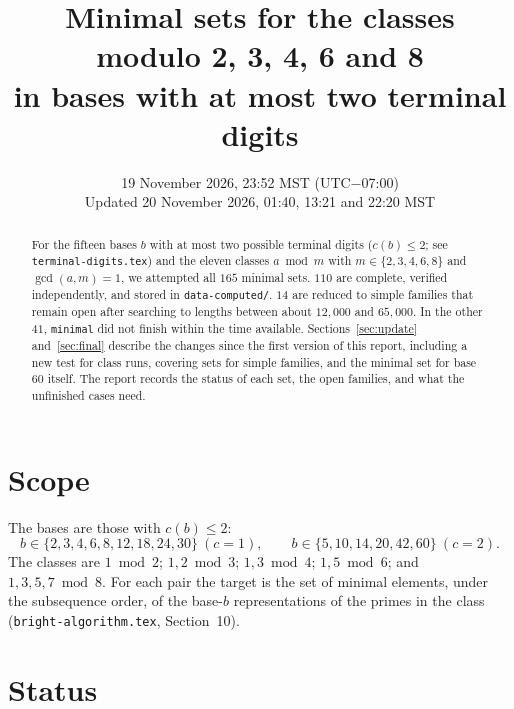 \documentclass[11pt]{article}
\title{Minimal sets for the classes modulo 2, 3, 4, 6 and 8\\ in bases with at most two terminal digits}
\author{}  %
\date{19 November 2026, 23:52 MST (UTC$-$07:00)\\ Updated 20 November 2026, 01:40, 13:21 and 22:20 MST}
\newcommand{\code}[1]{\texttt{#1}}
\begin{document}
\maketitle

\begin{abstract}
For the fifteen bases $b$ with at most two possible terminal digits ($c(b)\le 2$; see \code{terminal-digits.tex}) and the eleven classes $a \bmod m$ with $m\in\{2,3,4,6,8\}$ and $\gcd(a,m)=1$, we attempted all $165$ minimal sets. $110$ are complete, verified independently, and stored in \code{data-computed/}. $14$ are reduced to simple families that remain open after searching to lengths between about $12{,}000$ and $65{,}000$. In the other $41$, \code{minimal} did not finish within the time available. Sections~\ref{sec:update} and~\ref{sec:final} describe the changes since the first version of this report, including a new test for class runs, covering sets for simple families, and the minimal set for base 60 itself. The report records the status of each set, the open families, and what the unfinished cases need.
\end{abstract}

\section{Scope}

The bases are those with $c(b)\le 2$:
\[
  b\in\{2,3,4,6,8,12,18,24,30\}\ (c=1),\qquad b\in\{5,10,14,20,42,60\}\ (c=2).
\]
The classes are $1 \bmod 2$; $1,2 \bmod 3$; $1,3 \bmod 4$; $1,5 \bmod 6$; and $1,3,5,7 \bmod 8$. For each pair the target is the set of minimal elements, under the subsequence order, of the base-$b$ representations of the primes in the class (\code{bright-algorithm.tex}, Section~10).

\section{Status}
\end{document}
